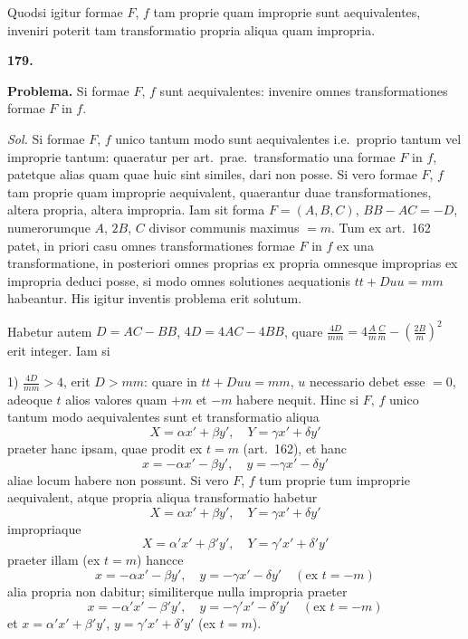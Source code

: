 \documentclass[12pt,a4paper]{article}
\theoremstyle{plain}
\begin{document}
Quodsi igitur formae $F$, $f$ tam proprie quam improprie sunt aequivalentes, inveniri poterit tam transformatio propria aliqua quam impropria.

\bigskip

\textbf{179.}

\textbf{Problema.} Si formae $F$, $f$ sunt aequivalentes: invenire omnes transformationes formae $F$ in $f$.

\textit{Sol.} Si formae $F$, $f$ unico tantum modo sunt aequivalentes i.e.~proprio tantum vel improprie tantum: quaeratur per art.~prae.~transformatio una formae $F$ in $f$, patetque alias quam quae huic sint similes, dari non posse. Si vero formae $F$, $f$ tam proprie quam improprie aequivalent, quaerantur duae transformationes, altera propria, altera impropria. Iam sit forma $F = (A,B,C)$, $BB - AC = -D$, numerorumque $A$, $2B$, $C$ divisor communis maximus $= m$. Tum ex art.~162 patet, in priori casu omnes transformationes formae $F$ in $f$ ex una transformatione, in posteriori omnes proprias ex propria omnesque improprias ex impropria deduci posse, si modo omnes solutiones aequationis $tt + Duu = mm$ habeantur. His igitur inventis problema erit solutum.

Habetur autem $D = AC - BB$, $4D = 4AC - 4BB$, quare $\frac{4D}{mm} = 4\frac{A}{m}\frac{C}{m} - (\frac{2B}{m})^2$ erit integer. Iam si

1) $\frac{4D}{mm} > 4$, erit $D > mm$: quare in $tt + Duu = mm$, $u$ necessario debet esse $= 0$, adeoque $t$ alios valores quam $+m$ et $-m$ habere nequit. Hinc si $F$, $f$ unico tantum modo aequivalentes sunt et transformatio aliqua
\[
X = \alpha x' + \beta y', \quad Y = \gamma x' + \delta y'
\]
praeter hanc ipsam, quae prodit ex $t = m$ (art.~162), et hanc
\[
x = -\alpha x' - \beta y', \quad y = -\gamma x' - \delta y'
\]
aliae locum habere non possunt. Si vero $F$, $f$ tum proprie tum improprie aequivalent, atque propria aliqua transformatio habetur
\[
X = \alpha x' + \beta y', \quad Y = \gamma x' + \delta y'
\]
impropriaque
\[
X = \alpha' x' + \beta' y', \quad Y = \gamma' x' + \delta' y'
\]
praeter illam (ex $t = m$) hancce
\[
x = -\alpha x' - \beta y', \quad y = -\gamma x' - \delta y' \quad (\text{ex } t = -m)
\]
alia propria non dabitur; similiterque nulla impropria praeter
\[
x = -\alpha' x' - \beta' y', \quad y = -\gamma' x' - \delta' y' \quad (\text{ex } t = -m)
\]
et $x = \alpha' x' + \beta' y'$, $y = \gamma' x' + \delta' y'$ (ex $t = m$).
\end{document}

